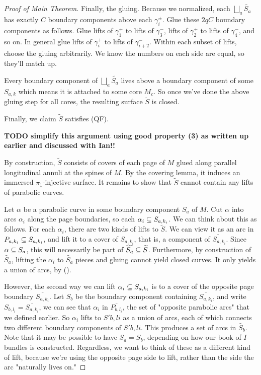 \begin{proof}[Proof of Main Theorem]
Finally, the gluing. Because we normalized, each $\bigsqcup_a \widetilde{S_a}$ has
exactly $C$ boundary components above each $\gamma_i^\pm$.  Glue these $2qC$
boundary components as follows. Glue lifts of $\gamma_1^+$ to lifts of
$\gamma_3^-$, lifts of $\gamma_2^+$ to lifts of $\gamma_4^-$, and so on. In
general glue lifts of $\gamma_i^+$ to lifts of $\gamma_{i+2}^-$. Within each
subset of lifts, choose the gluing arbitrarily. We know the numbers on each
side are equal, so they'll match up.

Every boundary component of $\bigsqcup_a \widetilde{S_a}$ lives above a boundary component
of some $S_{a,k}$ which means it is attached to some core $M_c$. So once we've done
the above gluing step for all cores, the resulting surface $\widetilde{S}$ is closed.


Finally, we claim $\widetilde{S}$ satisfies (QF).


\textbf{TODO simplify this argument using good property (3) as written up
earlier and discussed with Ian!!}

By construction, $\widetilde{S}$ consists of covers of each page of $M$ glued along
parallel longitudinal annuli at the spines of $M$. By the covering lemma, it
induces an immersed $\pi_1$-injective surface. It remains to show that
$\widetilde{S}$ cannot contain any lifts of parabolic curves.

Let $\alpha$ be a parabolic curve in some boundary component $S_a$ of $M$. Cut
$\alpha$ into arcs $\alpha_i$ along the page boundaries, so each $\alpha_i \subseteq
S_{a,k_i}$.  We can think about this as follows. For each $\alpha_i$, there are two
kinds of lifts to $\widetilde{S}$. We can view it as an arc in $P_{a,k_i} \subseteq
S_{a,k_i}$, and lift it to a cover of $S_{a,k_i}$, that is, a component of
$\widetilde{S_{a,k_i}}$. Since $\alpha \subseteq S_a$, this will necessarily be part
of $\widetilde{S_a} \subseteq \widetilde{S}$. Furthermore, by construction of
$\widetilde{S_a}$, lifting the $\alpha_i$ to $\widetilde{S_a}$ pieces and
gluing cannot yield closed curves.  It only yields a union of arcs, by (\dag).

However, the second way we can lift $\alpha_i \subseteq S_{a,k_i}$ is to a cover of the
opposite page boundary $\overline{S_{a,k_i}}$. Let $S_b$ be the boundary component
containing $\overline{S_{a,k_i}}$, and write $S_{b,l_i} = \overline{S_{a,k_i}}$, we can see that $\alpha_i$
in $\overline{P_{b,l_i}}$, the set of "opposite parabolic arcs" that we defined earlier.
So $\alpha_i$ lifts to $S'b,li$ as a union of arcs, each of which connects two
different boundary components of $S'b,li$. This produces a set of arcs in
$\widetilde{S_b}$. Note that it may be possible to have $S_a = S_b$, depending on
how our book of $I$-bundles is constructed.  Regardless, we want to think of
these as a different kind of lift, because we're using the opposite page side
to lift, rather than the side the arc "naturally lives on."


\end{proof}
